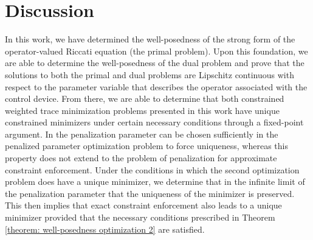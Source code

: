 \documentclass{amsart}
\newcommand{\bA}{\mathbf A}
\newcommand{\bX}{\mathbf X}
\newcommand{\bG}{\mathbf G}
\begin{document}
\section{Discussion} \label{sec: discussion}



In this work, we have determined the well-posedness of the strong form of the operator-valued Riccati equation (the primal problem). Upon this foundation, we are able to determine the well-posedness of the dual problem and prove that the solutions to both the primal and dual problems are Lipschitz continuous with respect to the parameter variable that describes the operator associated with the control device. From there, we are able to determine that both constrained weighted trace minimization problems presented in this work have unique constrained minimizers under certain necessary conditions through a fixed-point argument. In the penalization parameter can be chosen sufficiently in the penalized parameter optimization problem to force uniqueness, whereas this property does not extend to the problem of penalization for approximate constraint enforcement. Under the conditions in which the second optimization problem does have a unique minimizer, we determine that in the infinite limit of the penalization parameter that the uniqueness of the minimizer is preserved. This then implies that exact constraint enforcement also leads to a unique minimizer provided that the necessary conditions prescribed in Theorem \ref{theorem: well-posedness optimization 2} are satisfied. 
\end{document}
